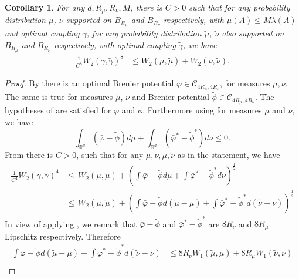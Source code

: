 \documentclass[11pt]{article}
\newtheorem{corollary}[lemma]{Corollary}
\newcommand{\R}{\mathbb R}
\newcommand{\1}{\mathbbm{1}}
\numberwithin{equation}{section}
\begin{document}
\begin{corollary}
    For any $d,R_\mu,R_\nu,M$, there is $C>0$ such that 
for any probability distribution $\mu$, $\nu$ supported on $B_{R_\mu}$ and $B_{R_\nu}$ respectively, with $\mu(A) \leq M\lambda (A)$ and optimal coupling $\gamma$, for any probability distribution $\tilde{\mu}$, $\tilde{\nu}$ also supported on $B_{R_\mu}$ and $B_{R_\nu}$ respectively, with optimal coupling $\tilde{\gamma}$, we have
    \begin{align*}
            \frac{1}{C^8} W_2(\gamma,\tilde{\gamma})^8 &\leq W_2(\mu,\tilde{\mu}) + W_2(\nu,\tilde{\nu}).
    \end{align*}
    \label{cor:stabilityCoupling}
\end{corollary}
\begin{proof} 
    By  there is an optimal Brenier potential $\bar{\varphi} \in \mathcal{C}_{4R_\mu,4R_\nu}$, for measures $\mu,\nu$. The same is true for measures $\tilde{\mu}$,  $\tilde{\nu}$ and Brenier potential $\tilde{\phi} \in \mathcal{C}_{4R_\mu,4R_\nu}$. The hypotheses of  are satisfied for $\bar{\varphi}$ and $\tilde{\phi}$.  Furthermore using  for measures $\mu$ and $\nu$,  we have
    \begin{equation*}
        \int_{\R^d}(\bar{\varphi}-\tilde{\phi})d\mu+\int_{\R^d}(\bar{\varphi}^*-\tilde{\phi}^*)d\nu\leq 0.
    \end{equation*}
    From  there is $C>0$, such that for any $\mu,\nu,\tilde{\mu},\tilde{\nu}$ as in the statement, we have
    \begin{align}
        \frac{1}{C^4} W_2(\gamma,\tilde{\gamma})^4 &\leq\, W_2(\mu,\tilde{\mu}) +  \left(\int \bar{\varphi} - \tilde{\phi} d\tilde{\mu} + \int \bar{\varphi}^* - \tilde{\phi}^* d\tilde{\nu} \right)^{\frac{1}{2}}\nonumber\\
       &\leq\, W_2(\mu,\tilde{\mu}) +  \left(\int \bar{\varphi} - \tilde{\phi} d(\tilde{\mu} - \mu) + \int \bar{\varphi}^* - \tilde{\phi}^* d(\tilde{\nu} - \nu) \right)^{\frac{1}{2}} 
       \label{eq:cor_stability_coupling1}
    \end{align}
    In view of applying \cite[Theorem 1.14]{ref_villani_topics}, we remark that $\bar{\varphi}-\tilde{\phi}$ and $\bar{\varphi}^*-\tilde{\phi}^*$ are $8R_\nu$ and $8R_\mu$ Lipschitz respectively. Therefore
    \begin{align}
        \int \bar{\varphi} - \tilde{\phi} d(\tilde{\mu} - \mu) + \int \bar{\varphi}^* - \tilde{\phi}^* d(\tilde{\nu} - \nu)& \leq 8R_\nu W_1(\tilde{\mu},\mu)+8R_\mu W_1(\tilde{\nu},\nu) \nonumber \\

\end{align}
\end{proof}
\end{document}
